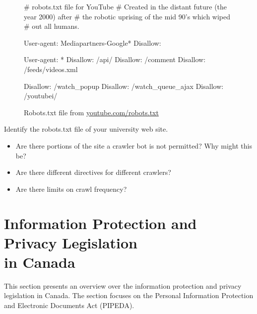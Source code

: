 \begin{figure}
\begin{textcode}
# robots.txt file for YouTube
# Created in the distant future (the year 2000) after
# the robotic uprising of the mid 90's which wiped 
# out all humans.

User-agent: Mediapartners-Google*
Disallow:

User-agent: *
Disallow: /api/
Disallow: /comment
Disallow: /feeds/videos.xml

Disallow: /watch_popup
Disallow: /watch_queue_ajax
Disallow: /youtubei/
\end{textcode}
\caption[Example robots.txt file]{Robots.txt file from \url{youtube.com/robots.txt}}
\label{fig:youtuberobots}
\end{figure}

\begin{exercisebox}

Identify the robots.txt file of your university web site.
\begin{itemize}
  \item Are there portions of the site a crawler bot is not permitted? Why might this be?
  \item Are there different directives for different crawlers?
  \item Are there limits on crawl frequency?
\end{itemize}
\end{exercisebox}

\section{Information Protection and Privacy Legislation\\ in Canada}
\label{sec:privacy}

This section presents an overview over the information protection and privacy legislation in Canada. The section focuses on the Personal Information Protection and Electronic Documents Act (PIPEDA).

